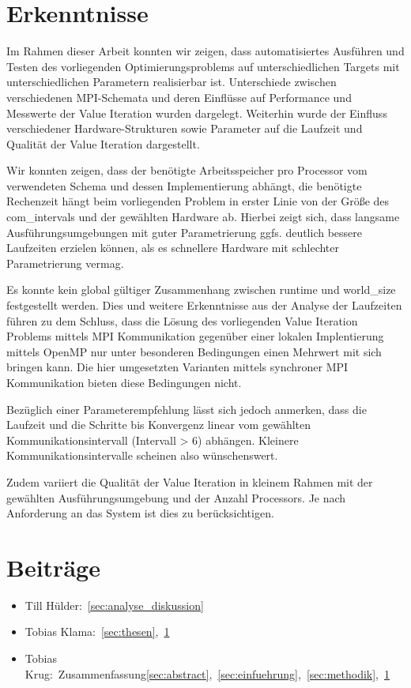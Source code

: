 \section{Erkenntnisse}
\label{sec:erkenntnisse}
Im Rahmen dieser Arbeit konnten wir zeigen, dass automatisiertes Ausführen und Testen des vorliegenden Optimierungsproblems
auf unterschiedlichen Targets mit unterschiedlichen Parametern realisierbar ist.
Unterschiede zwischen verschiedenen MPI-Schemata und deren Einflüsse auf Performance und Messwerte der Value Iteration wurden dargelegt.
Weiterhin wurde der Einfluss verschiedener Hardware-Strukturen sowie Parameter auf die Laufzeit und Qualität der Value Iteration dargestellt.

Wir konnten zeigen, dass der benötigte Arbeitsspeicher pro Processor vom verwendeten Schema und dessen Implementierung abhängt, die benötigte Rechenzeit hängt beim vorliegenden Problem in erster Linie von der Größe des com\_intervals und der gewählten Hardware ab. Hierbei zeigt sich, dass langsame Ausführungsumgebungen mit guter Parametrierung ggfs. deutlich bessere Laufzeiten erzielen können, als es schnellere Hardware mit schlechter Parametrierung vermag.

Es konnte kein global gültiger Zusammenhang zwischen runtime und world\_size festgestellt werden. Dies und weitere Erkenntnisse aus der Analyse der Laufzeiten führen zu dem Schluss, dass die Lösung des vorliegenden Value Iteration Problems mittels MPI Kommunikation gegenüber einer lokalen Implentierung mittels OpenMP nur unter besonderen Bedingungen einen Mehrwert mit sich bringen kann. Die hier umgesetzten Varianten mittels synchroner MPI Kommunikation bieten diese Bedingungen nicht.

Bezüglich einer Parameterempfehlung lässt sich jedoch anmerken, dass die Laufzeit und die Schritte bis Konvergenz linear vom gewählten Kommunikationsintervall (Intervall > 6) abhängen. Kleinere Kommunikationsintervalle scheinen also wünschenswert.

Zudem variiert die Qualität der Value Iteration in kleinem Rahmen mit der gewählten Ausführungsumgebung und der Anzahl Processors. Je nach Anforderung an das System ist dies zu berücksichtigen.

\section{Beiträge}
\label{sec:beitraege}

\begin{itemize}
    \item Till Hülder:~\ref{sec:analyse_diskussion}
    \item Tobias Klama:~\ref{sec:thesen},~\ref{sec:erkenntnisse}
    \item Tobias Krug:~Zusammenfassung\ref{sec:abstract},~\ref{sec:einfuehrung},~\ref{sec:methodik},~\ref{sec:erkenntnisse}
\end{itemize}